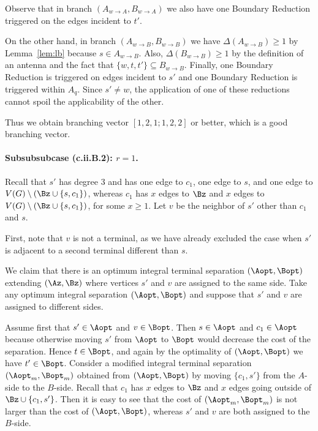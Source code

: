 Observe that in branch $(A_{w\to A},B_{w\to A})$ we also have one Boundary Reduction triggered on the edges incident to $t'$.

On the other hand, in branch $(A_{w\to B},B_{w\to B})$ we have $\Delta(A_{w\to B})\geq 1$ by Lemma~\ref{lem:lb} because $s\in A_{w\to B}$. Also, $\Delta(B_{w\to B})\geq 1$ by the definition of an antenna and the fact that $\{w,t,t'\}\subseteq B_{w\to B}$. Finally, one Boundary Reduction is triggered on edges incident to $s'$ and one Boundary Reduction is triggered within $A_q$. Since $s'\neq w$, the application of one of these reductions cannot spoil the applicability of the other.

Thus we obtain branching vector $[1,2,1;1,2,2]$ or better, which is a good branching vector.









\paragraph*{Subsubsubcase (c.ii.B.2): $r=1$.}

Recall that $s'$ has degree $3$ and has one edge to $c_1$, one edge to $s$, and one edge to $V(G)\setminus (\Bz\cup \{s,c_1\})$, whereas $c_1$ has $x$ edges to $\Bz$ and $x$ edges to $V(G)\setminus (\Bz\cup \{s,c_1\})$, for some $x\geq 1$. Let $v$ be the neighbor of $s'$ other than $c_1$ and $s$.

First, note that $v$ is not a terminal, as we have already excluded the case 
when $s'$ is adjacent to a second terminal different than $s$.

We claim that there is an optimum integral terminal separation $(\Aopt,\Bopt)$ extending $(\Az,\Bz)$ where vertices $s'$ and $v$ are assigned to the same side. Take any optimum integral separation $(\Aopt,\Bopt)$ and suppose that $s'$ and $v$ are assigned to different sides.

Assume first that $s'\in \Aopt$ and $v\in \Bopt$. Then $s\in \Aopt$ and $c_1\in \Aopt$ because otherwise moving $s'$ from $\Aopt$ to $\Bopt$ would decrease the cost of the separation. Hence $t\in \Bopt$, and again by the optimality of $(\Aopt,\Bopt)$ we have $t'\in \Bopt$. Consider a modified integral terminal separation $(\Aopt_m,\Bopt_m)$ obtained from $(\Aopt,\Bopt)$ by moving $\{c_1,s'\}$ from the $A$-side to the $B$-side. Recall that $c_1$ has $x$ edges to $\Bz$ and $x$ edges going outside of $\Bz\cup \{c_1,s'\}$. Then it is easy to see that the cost of $(\Aopt_m,\Bopt_m)$ is not larger than the cost of $(\Aopt,\Bopt)$, whereas $s'$ and $v$ are both assigned to the $B$-side.

